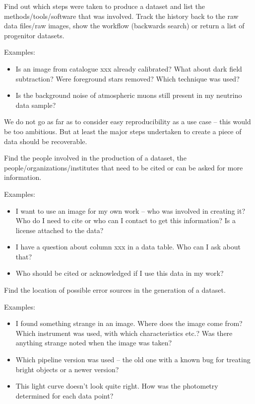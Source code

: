         Find out which steps were taken to produce a dataset and list the methods/tools/software that was involved. 
        Track the history back to the raw data files/raw images, show the workflow (backwards search) or return a list of progenitor datasets.

        \noindent Examples: 
        \begin{itemize}
            \item Is an image from catalogue xxx already calibrated?
What about dark field subtraction? Were foreground stars removed? Which technique
was used?  
            \item Is the background noise of atmospheric muons still present in my neutrino data sample?  
        \end{itemize}

        We do not go as far as to consider easy reproducibility as a use case -- this would be too ambitious. But at least the 
        major steps undertaken to create a piece of data should be recoverable.


        Find the people involved in the production of a dataset,
        the people/organizations/institutes that need to be cited or can be asked for more information.

        \noindent Examples: 
        \begin{itemize}
            \item I want to use an image for my own work -- who was involved in
creating it? Who do I need to cite or who can I contact to get this information? Is a license attached to the data? 
            \item I have a question about column xxx in a data
table. Who can I ask about that?  
            \item Who should be cited or acknowledged if I use this data in my work?
        \end{itemize}


        Find the location of possible error sources in the generation of a dataset.

        \noindent Examples:
        \begin{itemize}
            \item I found something strange in an image. Where does
the image come from? Which instrument was used, with which characteristics
etc.? Was there anything strange noted when the image was taken?  
            \item Which pipeline version was used -- the old one
with a known bug for treating bright objects or a newer version?  
            \item This light curve doesn't look quite right. How was
the photometry determined for each data point?  
        \end{itemize}


